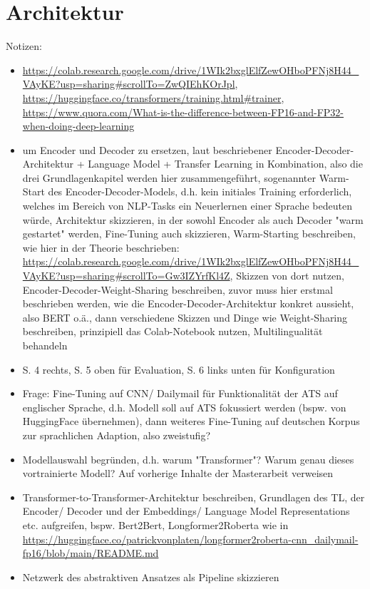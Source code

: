 \section{Architektur}
Notizen:
\begin{itemize}
	\item \url{https://colab.research.google.com/drive/1WIk2bxglElfZewOHboPFNj8H44_VAyKE?usp=sharing#scrollTo=ZwQIEhKOrJpl}, \url{https://huggingface.co/transformers/training.html#trainer}, \url{https://www.quora.com/What-is-the-difference-between-FP16-and-FP32-when-doing-deep-learning}
	\item \cite{ROT20} um Encoder und Decoder zu ersetzen, laut beschriebener Encoder-Decoder-Architektur + Language Model + Transfer Learning in Kombination, also die drei Grundlagenkapitel werden hier zusammengeführt, sogenannter Warm-Start des Encoder-Decoder-Models, d.h. kein initiales Training erforderlich, welches im Bereich von NLP-Tasks ein Neuerlernen einer Sprache bedeuten würde, Architektur skizzieren, in der sowohl Encoder als auch Decoder "warm gestartet" werden, Fine-Tuning auch skizzieren, Warm-Starting beschreiben, wie hier in der Theorie beschrieben: \url{https://colab.research.google.com/drive/1WIk2bxglElfZewOHboPFNj8H44_VAyKE?usp=sharing#scrollTo=Gw3IZYrfKl4Z}, Skizzen von dort nutzen, Encoder-Decoder-Weight-Sharing beschreiben, zuvor muss hier erstmal beschrieben werden, wie die Encoder-Decoder-Architektur konkret aussieht, also BERT o.ä., dann verschiedene Skizzen und Dinge wie Weight-Sharing beschreiben, prinzipiell das Colab-Notebook nutzen, Multilingualität behandeln
	\item \cite{YAN19} S. 4 rechts, S. 5 oben für Evaluation, S. 6 links unten für Konfiguration
	\item Frage: Fine-Tuning auf CNN/ Dailymail für Funktionalität der ATS auf englischer Sprache, d.h. Modell soll auf ATS fokussiert werden (bspw. von HuggingFace übernehmen), dann weiteres Fine-Tuning auf deutschen Korpus zur sprachlichen Adaption, also zweistufig?
	\item Modellauswahl begründen, d.h. warum "Transformer"? Warum genau dieses vortrainierte Modell? Auf vorherige Inhalte der Masterarbeit verweisen
	\item Transformer-to-Transformer-Architektur beschreiben, Grundlagen des TL, der Encoder/ Decoder und der Embeddings/ Language Model Representations etc. aufgreifen, bspw. Bert2Bert, Longformer2Roberta wie in \url{https://huggingface.co/patrickvonplaten/longformer2roberta-cnn_dailymail-fp16/blob/main/README.md}
	\item Netzwerk des abstraktiven Ansatzes als Pipeline skizzieren

\end{itemize}
